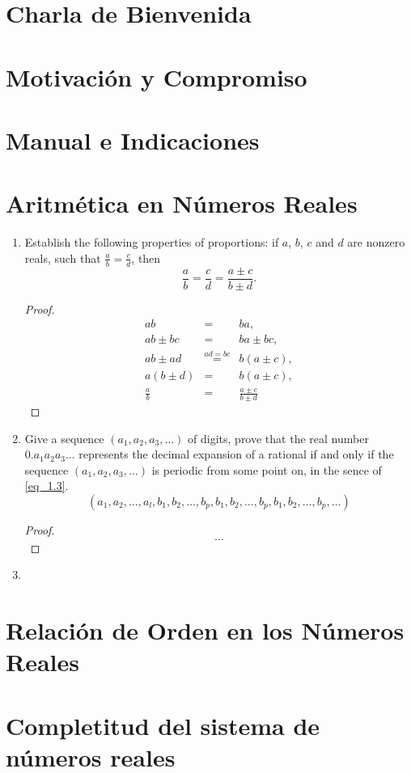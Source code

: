 \section{Charla de Bienvenida}

\section{Motivaci\'{o}n y Compromiso}

\section{Manual e Indicaciones}

\section{Aritm\'{e}tica en N\'{u}meros Reales}
\begin{enumerate}
  \item Establish the following properties of proportions: if $a$, $b$, $c$ and $d$ are nonzero reals, such that $\frac{a}{b}= \frac{c}{d}$, then
  \begin{equation*}
    \frac{a}{b}= \frac{c}{d}= \frac{a\pm c}{b\pm d}.
  \end{equation*}
  \begin{proof}
    \begin{eqnarray*}
      ab&=& ba,\\
      ab\pm bc &=& ba\pm bc,\\
      ab\pm ad&\overset{ad= bc}{=}& b(a\pm c),\\
      a(b\pm d)&=& b(a\pm c),\\
      \frac{a}{b}&=& \frac{a\pm c}{b\pm d}
    \end{eqnarray*}
  \end{proof}
  
  \item Give a sequence $(a_{1}, a_{2}, a_{3}, \dots)$ of digits, prove that the real number $0.a_{1}a_{2}a_{3}\dots$ represents the decimal expansion of a rational if and only if the sequence $(a_{1}, a_{2}, a_{3}, \dots)$ is periodic from some point on, in the sence of \ref{eq_1.3}.
  \begin{equation}\label{eq_1.3}
    (a_{1}, a_{2}, \dots, a_{l}, b_{1}, b_{2}, \dots, b_{p}, b_{1}, b_{2}, \dots, b_{p}, b_{1}, b_{2}, \dots, b_{p}, \dots)
  \end{equation}
  \begin{proof}
  $$\dots$$
  \hline
  \end{proof}
  
  \item
\end{enumerate}

\section{Relaci\'{o}n de Orden en los N\'{u}meros Reales}

\section{Completitud del sistema de n\'{u}meros reales}
